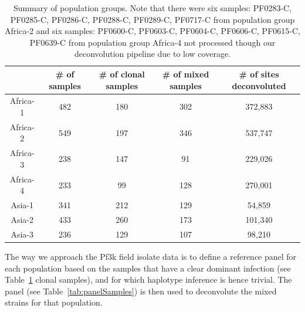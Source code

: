 \documentclass{article}
\begin{document}
\begin{table}[ht]
\centering
\begin{tabular}{|c|c|c|c|c|}
\hline\hline
        & \# of samples  & \# of clonal samples & \# of mixed samples & \# of sites deconvoluted\\
        \hline
Africa-1 & 482 & 180 & 302 & 372,883 \\
Africa-2 & 549 & 197 & 346 & 537,747 \\
Africa-3	& 238 & 147 & 91  & 229,026 \\
Africa-4	& 233 & 99  & 128 & 270,001 \\
Asia-1	  & 341 & 212 & 129 & 54,859  \\
Asia-2	  & 433 & 260 & 173 & 101,340 \\
Asia-3	  & 236 & 129 & 107 & 98,210  \\
\hline
\hline
\end{tabular}
\caption{Summary of population groups. Note that there were six samples: PF0283-C, PF0285-C, PF0286-C, PF0288-C, PF0289-C, PF0717-C from population group Africa-2 and six samples: PF0600-C, PF0603-C, PF0604-C, PF0606-C, PF0615-C, PF0639-C from population group Africa-4 not processed though our deconvolution pipeline due to low coverage.}\label{tab:sevenGroups}
\end{table}

The way we approach the Pf3k field isolate data is to define a reference panel for each population based on the samples that have a clear dominant infection (see Table~\ref{tab:sevenGroups} clonal samples), and for which haplotype inference is hence trivial. The panel (see Table~\ref{tab:panelSamples}) is then used to deconvolute the mixed strains for that population.
\end{document}

